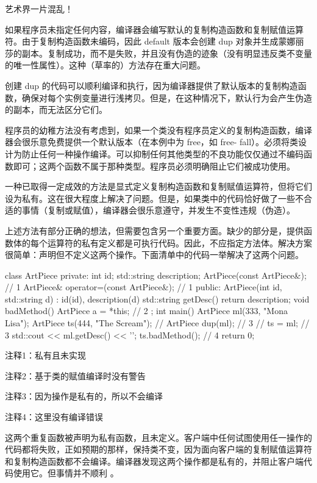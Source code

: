 艺术界一片混乱！


如果程序员未指定任何内容，编译器会编写默认的复制构造函数和复制赋值运算符。由于复制构造函数未编码，因此 default 版本会创建 dup 对象并生成蒙娜丽莎的副本。复制成功，而不是失败，并且没有伪造的迹象（没有明显违反类不变量的唯一性属性）。这种（草率的）方法存在重大问题。

创建 dup 的代码可以顺利编译和执行，因为编译器提供了默认版本的复制构造函数，确保对每个实例变量进行浅拷贝。但是，在这种情况下，默认行为会产生伪造的副本，而无法区分它们。

程序员的幼稚方法没有考虑到，如果一个类没有程序员定义的复制构造函数，编译器会很乐意免费提供一个默认版本（在本例中为 free，如 free- fall）。必须将类设计为防止任何一种操作编译。可以抑制任何其他类型的不良功能仅仅通过不编码函数即可；这两个函数不属于那种类型。程序员必须明确阻止它们被成功使用。

一种已取得一定成效的方法是显式定义复制构造函数和复制赋值运算符，但将它们设为私有。这在很大程度上解决了问题。但是，如果类中的代码恰好做了一些不合适的事情（复制或赋值），编译器会很乐意遵守，并发生不变性违规（伪造）。


上述方法有部分正确的想法，但需要包含另一个重要方面。缺少的部分是，提供函数体的每个运算符的私有定义都是可执行代码。因此，不应指定方法体。解决方案很简单：声明但不定义这两个操作。下面清单中的代码一举解决了这两个问题。


\begin{cpp}
class ArtPiece {
private:
  int id;
  std::string description;
  ArtPiece(const ArtPiece&); // 1
  ArtPiece& operator=(const ArtPiece&); // 1
public:
  ArtPiece(int id, std::string d) : id(id), description(d) {}
  std::string getDesc() { return description; }
  void badMethod() { ArtPiece a = *this; } // 2
};
int main() {
  ArtPiece ml(333, "Mona Lisa");
  ArtPiece ts(444, "The Scream");
  // ArtPiece dup(ml); // 3
  // ts = ml; // 3
  std::cout << ml.getDesc() << '\n';
  ts.badMethod(); // 4
  return 0;
}
\end{cpp}

{\footnotesize
注释1：私有且未实现

注释2：基于类的赋值编译时没有警告

注释3：因为操作是私有的，所以不会编译

注释4：这里没有编译错误
}

这两个重复函数被声明为私有函数，且未定义。客户端中任何试图使用任一操作的代码都将失败，正如预期的那样，保持类不变，因为面向客户端的复制赋值运算符和复制构造函数都不会编译。编译器发现这两个操作都是私有的，并阻止客户端代码使用它。但事情并不顺利 。

